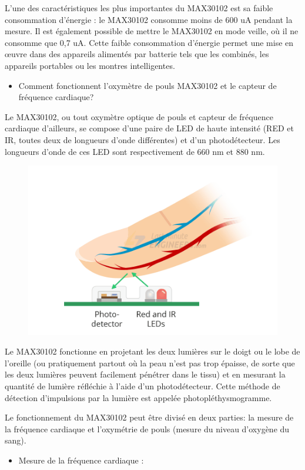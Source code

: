 \begin{flushleft}
\begin{figure}[h]
		\label{fig:labelname}
	\end{figure}
	L’une des caractéristiques les plus importantes du MAX30102 est sa faible consommation d’énergie : le MAX30102 consomme moins de 600 uA pendant la mesure. Il est également possible de mettre le MAX30102 en mode veille, où il ne consomme que 0,7 uA. Cette faible consommation d’énergie permet une mise en œuvre dans des appareils alimentés par batterie tels que les combinés, les appareils portables ou les montres intelligentes.\newpage
	\begin{itemize}
		\item {\Large Comment fonctionnent l’oxymètre de pouls MAX30102 et le capteur de fréquence cardiaque?}
	\end{itemize}
	Le MAX30102, ou tout oxymètre optique de pouls et capteur de fréquence cardiaque d’ailleurs, se compose d’une paire de LED de haute intensité (RED et IR, toutes deux de longueurs d’onde différentes) et d’un photodétecteur. Les longueurs d’onde de ces LED sont respectivement de 660 nm et 880 nm.\newline
	\begin{figure}[h]
		\centering
		\includegraphics{chapitres/images/Capteur5.PNG}
		\label{fig:labelname}
	\end{figure}
	Le MAX30102 fonctionne en projetant les deux lumières sur le doigt ou le lobe de l’oreille (ou pratiquement partout où la peau n’est pas trop épaisse, de sorte que les deux lumières peuvent facilement pénétrer dans le tissu) et en mesurant la quantité de lumière réfléchie à l’aide d’un photodétecteur. Cette méthode de détection d’impulsions par la lumière est appelée photopléthysmogramme.

	Le fonctionnement du MAX30102 peut être divisé en deux parties: la mesure de la fréquence cardiaque et l’oxymétrie de pouls (mesure du niveau d’oxygène du sang).\newline
		\begin{itemize}
		\item {\Large Mesure de la fréquence cardiaque :}
    	\end{itemize}
		

\end{flushleft}
